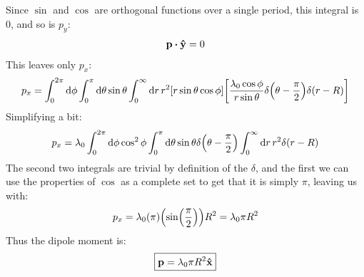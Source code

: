 \documentclass[12pt]{article}
\begin{document}
Since $\sin$ and $\cos$ are orthogonal functions over a single period, this integral is 0, and so is $p_y$:
\begin{align*}
  \vb{p}\vdot\vu{y}=0
\end{align*}
This leaves only $p_x$:
\begin{align*}
  p_x=\int_0^{2\pi}\dd{\phi}\int_0^\pi\dd{\theta}\sin\theta\int_0^\infty\dd{r}r^2
  \qty[r\sin\theta\cos\phi]\qty[\frac{\lambda_0\cos\phi}{r\sin\theta}
  \delta\qty(\theta-\frac\pi2)\delta(r-R)]
\end{align*}
Simplifying a bit:
\begin{align*}
  p_x=\lambda_0\int_0^{2\pi}\dd{\phi}\cos^2\phi
  \int_0^\pi\dd{\theta}\sin\theta\delta\qty(\theta-\frac\pi2)
  \int_0^\infty\dd{r}r^2\delta(r-R)
\end{align*}
The second two integrals are trivial by definition of the $\delta$, and the first we can use the properties of $\cos$ as a complete set to get that it is simply $\pi$, leaving us with:
\begin{align*}
  p_x=\lambda_0(\pi)\qty(\sin(\frac\pi2))R^2=\lambda_0\pi R^2
\end{align*}
Thus the dipole moment is:
\begin{align}
  \boxed{\vb{p}=\lambda_0\pi R^2\vu{x}}
\end{align}
\end{document}
